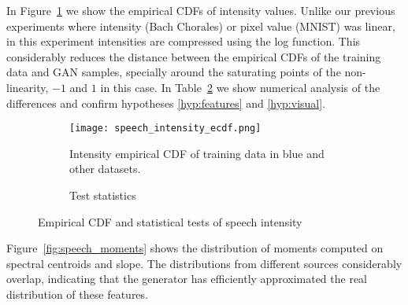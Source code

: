 In Figure~\ref{fig:speech_intensity_ecdf} we show the empirical CDFs of intensity
values. Unlike our previous experiments where intensity (Bach Chorales)
or pixel value (MNIST) was linear, in this experiment intensities are compressed using the
log function. This considerably reduces the distance between the empirical CDFs
of the training data and GAN samples,
specially around the saturating points of the non-linearity, $-1$ and $1$ in this
case. In Table~\ref{tbl:speech_intensity} we show numerical analysis of the
differences and confirm hypotheses \ref{hyp:features} and \ref{hyp:visual}.
\begin{figure}[!h]
    \begin{subfigure}[b]{0.65\textwidth}
        \texttt{[image: speech\_intensity\_ecdf.png]}
        \caption{Intensity empirical CDF of training data in blue
        and other datasets.}
        \label{fig:speech_intensity_ecdf}
    \end{subfigure}
    \quad
    \begin{subfigure}[b]{0.3\textwidth}
        \caption{Test statistics}
        \label{tbl:speech_intensity}
    \end{subfigure}
    \caption{Empirical CDF and statistical tests of speech intensity}
    \label{fig:speech_intensity}
\end{figure}

Figure~\ref{fig:speech_moments} shows the distribution of moments computed on
spectral centroids and slope. The distributions from different sources
considerably overlap, indicating that the generator has efficiently approximated
the real distribution of these features.

